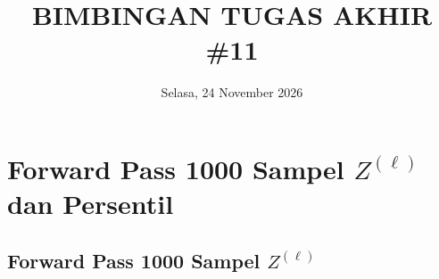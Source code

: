 \documentclass[11pt,a4paper]{article}
\title{
    \vspace{-1.6cm}
    \textbf{\Large BIMBINGAN TUGAS AKHIR \#11} \\[0.2em]
}
\author{}
\date{\vspace{-0.6cm} Selasa, 24 November 2026}
\theoremstyle{plain}
\theoremstyle{definition}
\theoremstyle{remark}
\begin{document}
\maketitle
\vspace{-1.1cm}
\setlength{\abovedisplayskip}{3pt}
\setlength{\belowdisplayskip}{3pt}
\setlength{\abovedisplayshortskip}{1pt}
\setlength{\belowdisplayshortskip}{1pt}

\section{Forward Pass 1000 Sampel \texorpdfstring{$Z^{(\ell)}$}{Z} dan Persentil}
\label{sec:formulasi_mc}

\subsection{Forward Pass 1000 Sampel \texorpdfstring{$Z^{(\ell)}$}{Z}}
\label{subsec:mc_forward}
\end{document}
